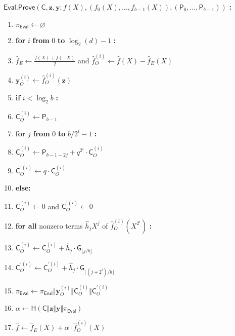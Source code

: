 \documentclass[11pt]{article}
\theoremstyle{Definition}
\begin{document}
\begin{mdframed}
$\mathsf{Eval.Prove}(\mathsf{C}, \mathbf{z}, \mathbf{y}; f(X), (f_0(X), \ldots, f_{b-1}(X)), \left(\mathsf{P}_0, \ldots, \mathsf{P}_{b-1}\right))$ \textbf{:}
\begin{enumerate}[nolistsep]
	\item $\pi_{\mathsf{Eval}} \gets \varnothing$
	\item \textbf{for} $i$ \textbf{from} $0$ \textbf{to} $\log_2(d) - 1$ \textbf{:}
	\item \pcind $\hat{f}_E \gets \frac{\hat{f}(X) + \hat{f}(-X)}{2}$ and $\hat{f}_O^{(i)} \gets \hat{f}(X) - \hat{f}_E(X)$
	\item \pcind $\mathbf{y}_O^{(i)} \gets \hat{f}_O^{(i)}(\mathbf{z})$
	\item \pcind \textbf{if} $i < \log_2 b$ \textbf{:}
	\item \pcind \pcind $\mathsf{C}_O^{(i)} \gets \mathsf{P}_{b-1}$
	\item \pcind \pcind \textbf{for} $j$ \textbf{from} $0$ \textbf{to} $b/2^i-1$ \textbf{:}
	\item \pcind \pcind \pcind $\mathsf{C}_O^{(i)} \gets \mathsf{P}_{b-1-2j} + q^{2^i} \cdot \mathsf{C}_O^{(i)}$ \label{line:evalprove-firsthalf-bigstep}
	\item \pcind \pcind $\mathsf{C}_O^{\prime(i)} \gets q \cdot \mathsf{C}_O^{(i)}$ \label{line:evalprove-firsthalf-shift}
	\item \pcind \textbf{else:}
	\item \pcind \pcind $\mathsf{C}_O^{(i)} \gets 0$ and $\mathsf{C}_O^{\prime(i)} \gets 0$
	\item \pcind \pcind \textbf{for all} nonzero terms $\hat{h}_jX^j$ of $\hat{f}_O^{(i)}(X^{2^i})$ \textbf{:}
	\item \pcind \pcind \pcind $\mathsf{C}_O^{(i)} \gets \mathsf{C}_O^{(i)} + \hat{h}_j \cdot \mathsf{G}_{\lfloor j/b \rfloor}$ \label{line:evalprove-secondhalf-regular}
	\item \pcind \pcind \pcind $\mathsf{C}_O^{\prime(i)} \gets \mathsf{C}_O^{\prime(i)} + \hat{h}_j \cdot \mathsf{G}_{\lfloor (j+2^i)/b\rfloor}$ \label{line:evalprove-secondhalf-prime}
	\item \pcind $\pi_{\mathsf{Eval}} \gets \pi_{\mathsf{Eval}} \Vert \mathbf{y}_O^{(i)} \Vert \mathsf{C}_O^{(i)} \Vert \mathsf{C}_O^{\prime(i)}$
	\item \pcind $\alpha \gets \mathsf{H}(\mathsf{C} \Vert \mathbf{z} \Vert \mathbf{y} \Vert \pi_{\mathsf{Eval}})$  
	\item \pcind $\hat{f} \gets \hat{f}_E(X) + \alpha \cdot \hat{f}_O^{(i)}(X)$

\end{enumerate}
\end{mdframed}
\end{document}
